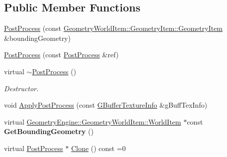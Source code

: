 \subsection*{Public Member Functions}
\begin{DoxyCompactItemize}
\item 
\mbox{\hyperlink{class_geometry_engine_1_1_geometry_post_process_1_1_post_process_a3df1b89c25bd790e3ded93e088aca222}{Post\+Process}} (const \mbox{\hyperlink{class_geometry_engine_1_1_geometry_world_item_1_1_geometry_item_1_1_geometry_item}{Geometry\+World\+Item\+::\+Geometry\+Item\+::\+Geometry\+Item}} \&bounding\+Geometry)
\item 
\mbox{\hyperlink{class_geometry_engine_1_1_geometry_post_process_1_1_post_process_af5599c4257746130644eb6beb421a25a}{Post\+Process}} (const \mbox{\hyperlink{class_geometry_engine_1_1_geometry_post_process_1_1_post_process}{Post\+Process}} \&ref)
\item 
\mbox{\label{class_geometry_engine_1_1_geometry_post_process_1_1_post_process_ae50dbe0c834a713d1f3163f9706b2e91}} 
virtual \mbox{\hyperlink{class_geometry_engine_1_1_geometry_post_process_1_1_post_process_ae50dbe0c834a713d1f3163f9706b2e91}{$\sim$\+Post\+Process}} ()
\begin{DoxyCompactList}\small\item\em Destructor. \end{DoxyCompactList}\item 
void \mbox{\hyperlink{class_geometry_engine_1_1_geometry_post_process_1_1_post_process_a2dbb157265ebdeea658982673e757d46}{Apply\+Post\+Process}} (const \mbox{\hyperlink{struct_geometry_engine_1_1_g_buffer_texture_info}{G\+Buffer\+Texture\+Info}} \&g\+Buff\+Tex\+Info)
\item 
\mbox{\label{class_geometry_engine_1_1_geometry_post_process_1_1_post_process_a19b7d991ecfc7af8f9ca2c9f79488b9a}} 
virtual \mbox{\hyperlink{class_geometry_engine_1_1_geometry_world_item_1_1_world_item}{Geometry\+Engine\+::\+Geometry\+World\+Item\+::\+World\+Item}} $\ast$const {\bfseries Get\+Bounding\+Geometry} ()
\item 
virtual \mbox{\hyperlink{class_geometry_engine_1_1_geometry_post_process_1_1_post_process}{Post\+Process}} $\ast$ \mbox{\hyperlink{class_geometry_engine_1_1_geometry_post_process_1_1_post_process_aa80749cf09041335f6b3bda3aaf31711}{Clone}} () const =0
\end{DoxyCompactItemize}
